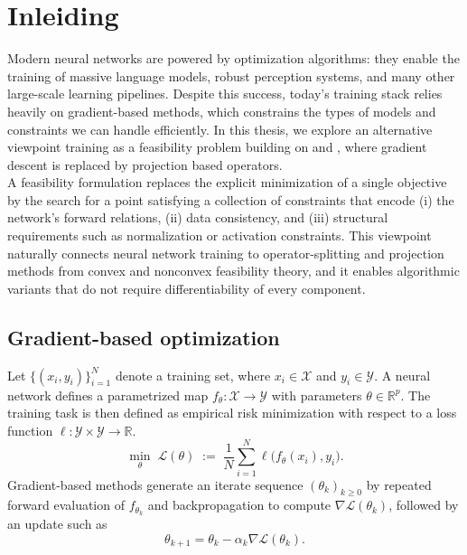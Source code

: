 \chapter{Inleiding}
\label{inleiding}
Modern neural networks are powered by optimization algorithms: they enable the training of massive language models, robust perception systems, and many other large-scale learning pipelines. Despite this success, today’s training stack relies heavily on gradient-based methods, which constrains the types of models and constraints we can handle efficiently. In this thesis, we explore an alternative viewpoint training as a feasibility problem building on \citet{elser2019learning} and \citet{bergmeister2025projection}, where gradient descent is replaced by projection based operators.
\\
\newline
A feasibility formulation replaces the explicit minimization of a single objective by the search for a point satisfying a collection of constraints that encode (i) the network’s forward relations, (ii) data consistency, and (iii) structural requirements such as normalization or activation constraints. This viewpoint naturally connects neural network training to operator-splitting and projection methods from convex and nonconvex feasibility theory, and it enables algorithmic variants that do not require differentiability of every component.

\section{Gradient-based optimization}
Let $\{(x_i,y_i)\}_{i=1}^N$ denote a training set, where $x_i \in \mathcal{X}$ and $y_i \in \mathcal{Y}$. A neural network defines a parametrized map $f_\theta:\mathcal{X}\to\mathcal{Y}$ with parameters $\theta \in \mathbb{R}^p$. The training task is then defined as empirical risk minimization with respect to a loss function $\ell:\mathcal{Y} \times \mathcal{Y}\to \mathbb{R}$.
\begin{equation*}
  \min_{\theta}\; \mathcal{L}(\theta)
  \;:=\; \frac{1}{N}\sum_{i=1}^N \ell\bigl(f_\theta(x_i),y_i\bigr).
\end{equation*}
Gradient-based methods generate an iterate sequence $(\theta_k)_{k\ge 0}$ by repeated forward evaluation of $f_{\theta_k}$ and backpropagation to compute $\nabla \mathcal{L}(\theta_k)$, followed by an update such as
\begin{equation*}
  \theta_{k+1} = \theta_k - \alpha_k\nabla \mathcal{L}(\theta_k).
\end{equation*}

